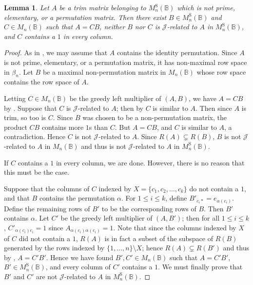 \documentclass[11pt]{article}
\newtheorem{lemma}[thm]{Lemma}
\numberwithin{equation}{section}
\newcommand{\B}{\mathbb{B}}
\newcommand{\Bn}{M_n(\B)}
\newcommand{\Halln}{M_n^{\text{S}}(\B)}
\newcommand{\J}{\mathscr{J}}
\begin{document}
\begin{lemma}
  Let $A$ be a trim matrix belonging to $\Halln$ which is not prime, elementary, or a
  permutation matrix. Then there exist $B \in \Halln$ and $C \in \Bn$ such that
  $A = CB$, neither $B$ nor $C$ is $\J$-related to $A$ in $\Halln$, and $C$
  contains a $1$ in every column.
\end{lemma}
\begin{proof}
  As in , we may assume that $A$ contains the
  identity permutation. Since $A$ is not prime, elementary, or a permutation
  matrix, it has non-maximal row space in $\beta_n$. Let $B$ be a maximal
  non-permutation matrix in $\Bn$ whose row space contains the row space of $A$.

  Letting $C \in \Bn$ be the greedy left multiplier of $(A, B)$, we have $A = CB$ by
  . Suppose that $C$ is $\J$-related to $A$; then
  by  $C$ is similar to $A$. Then since $A$ is trim, so
  too is $C$. Since $B$ was chosen to be a non-permutation matrix, the product
  $CB$ contains more $1$s than $C$. But $A = CB$, and $C$ is similar to $A$, a
  contradiction. Hence $C$ is not $\J$-related to $A$. Since $R(A) \subsetneq
  R(B)$, $B$ is not $\J$-related to $A$ in $\Bn$ and thus is not $\J$-related to
  $A$ in $\Halln$.

  If $C$ contains a $1$ in every column, we are done. However, there is no
  reason that this must be the case.

  Suppose that the columns of $C$ indexed by $X = \{c_1, c_2, \ldots, c_k\}$ do
  not contain a $1$, and that $B$ contains the permutation $\alpha$. For $1 \leq
  i \leq k$, define $B'_{c_i*} = e_{\alpha(c_i)}$. Define the remaining rows of
  $B'$ to be the corresponding rows of $B$. Then $B'$ contains $\alpha$. Let
  $C'$ be the greedy left multiplier of $(A, B')$; then for all $1 \leq i \leq
  k$, $C'_{\alpha(c_i)c_i} = 1$ since $A_{\alpha(c_i)\alpha(c_i)} = 1$. Note
  that since the columns indexed by $X$ of $C$ did not contain a $1$, $R(A)$ is
  in fact a subset of the subspace of $R(B)$ generated by the rows indexed by
  $\{1, \ldots, n\}\setminus X$; hence $R(A) \subsetneq R(B')$ and thus by
  , $A = C'B'$. Hence we have found $B', C' \in \Bn$
  such that $A = C'B'$, $B' \in \Halln$, and every column of $C'$ contains a
  $1$. We must finally prove that $B'$ and $C'$ are not $\J$-related to $A$ in
  $\Halln$. 
  

\end{proof}
\end{document}
